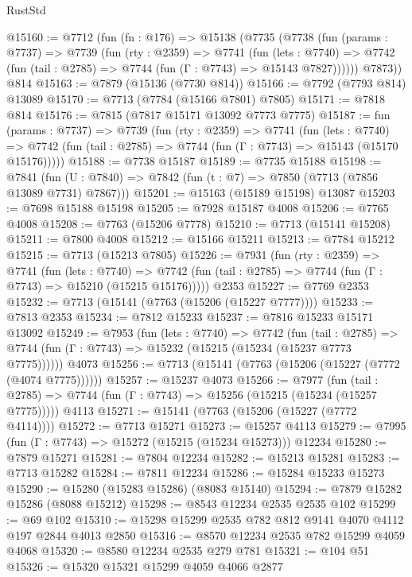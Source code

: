 \begin{lexlean}{RustStd}
\begin{coremodule}
@15160 := @7712
    (fun (fn : @176) =>
    @15138
      (@7735
        (@7738
          (fun (params : @7737) =>
          @7739
            (fun (rty : @2359) =>
            @7741
              (fun (lets : @7740) =>
              @7742 (fun (tail : @2785) => @7744 (fun (Γ : @7743) => @15143 @7827))))))
        @7873))
    @814
@15163 := @7879 (@15136 (@7730 @814))
@15166 := @7792 (@7793 @814) @13089
@15170 := @7713 (@7784 (@15166 @7801) @7805)
@15171 := @7818 @814
@15176 := @7815 (@7817 @15171 @13092 @7773 @7775)
@15187 := fun (params : @7737) =>
  @7739
    (fun (rty : @2359) =>
    @7741
      (fun (lets : @7740) =>
      @7742 (fun (tail : @2785) => @7744 (fun (Γ : @7743) => @15143 (@15170 @15176)))))
@15188 := @7738 @15187
@15189 := @7735 @15188
@15198 := @7841
    (fun (U : @7840) => @7842 (fun (t : @7) => @7850 (@7713 (@7856 @13089 @7731) @7867)))
@15201 := @15163 (@15189 @15198) @13087
@15203 := @7698 @15188 @15198
@15205 := @7928 @15187 @4008
@15206 := @7765 @4008
@15208 := @7763 (@15206 @7778)
@15210 := @7713 (@15141 @15208)
@15211 := @7800 @4008
@15212 := @15166 @15211
@15213 := @7784 @15212
@15215 := @7713 (@15213 @7805)
@15226 := @7931
    (fun (rty : @2359) =>
    @7741
      (fun (lets : @7740) =>
      @7742 (fun (tail : @2785) => @7744 (fun (Γ : @7743) => @15210 (@15215 @15176)))))
    @2353
@15227 := @7769 @2353
@15232 := @7713 (@15141 (@7763 (@15206 (@15227 @7777))))
@15233 := @7813 @2353
@15234 := @7812 @15233
@15237 := @7816 @15233 @15171 @13092
@15249 := @7953
    (fun (lets : @7740) =>
    @7742
      (fun (tail : @2785) =>
      @7744 (fun (Γ : @7743) => @15232 (@15215 (@15234 (@15237 @7773 @7775))))))
    @4073
@15256 := @7713 (@15141 (@7763 (@15206 (@15227 (@7772 (@4074 @7775))))))
@15257 := @15237 @4073
@15266 := @7977
    (fun (tail : @2785) => @7744 (fun (Γ : @7743) => @15256 (@15215 (@15234 (@15257 @7775)))))
    @4113
@15271 := @15141 (@7763 (@15206 (@15227 (@7772 @4114))))
@15272 := @7713 @15271
@15273 := @15257 @4113
@15279 := @7995 (fun (Γ : @7743) => @15272 (@15215 (@15234 @15273))) @12234
@15280 := @7879 @15271
@15281 := @7804 @12234
@15282 := @15213 @15281
@15283 := @7713 @15282
@15284 := @7811 @12234
@15286 := @15284 @15233 @15273
@15290 := @15280 (@15283 @15286) (@8083 @15140)
@15294 := @7879 @15282 @15286 (@8088 @15212)
@15298 := @8543 @12234 @2535 @2535 @102
@15299 := @69 @102
@15310 := @15298 @15299 @2535 @782 @812 @9141 @4070 @4112 @197 @2844 @4013 @2850
@15316 := @8570 @12234 @2535 @782 @15299 @4059 @4068
@15320 := @8580 @12234 @2535 @279 @781
@15321 := @104 @51
@15326 := @15320 @15321 @15299 @4059 @4066 @2877

\end{coremodule}
\end{lexlean}
